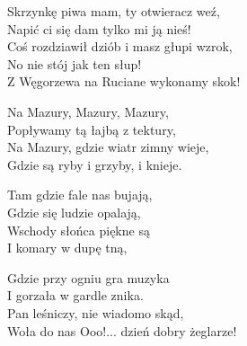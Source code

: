 \begin{text}
    Skrzynkę piwa mam, ty otwieracz weź,\\
    Napić ci się dam tylko mi ją nieś!\\
    Coś rozdziawił dziób i masz głupi wzrok,\\
    No nie stój jak ten słup!\\
    Z Węgorzewa na Ruciane wykonamy skok!

    \vin Na Mazury, Mazury, Mazury,\\
    \vin Popływamy tą łajbą z tektury,\\
    \vin Na Mazury, gdzie wiatr zimny wieje,\\
    \vin Gdzie są ryby i grzyby, i knieje.

    \vin Tam gdzie fale nas bujają,\\
    \vin Gdzie się ludzie opalają,\\
    \vin Wschody słońca piękne są\\
    \vin I komary w dupę tną,

    \vin Gdzie przy ogniu gra muzyka\\
    \vin I gorzała w gardle znika.\\
    \vin Pan leśniczy, nie wiadomo skąd,\\
    \vin Woła do nas Ooo!... dzień dobry żeglarze!
\end{text}
